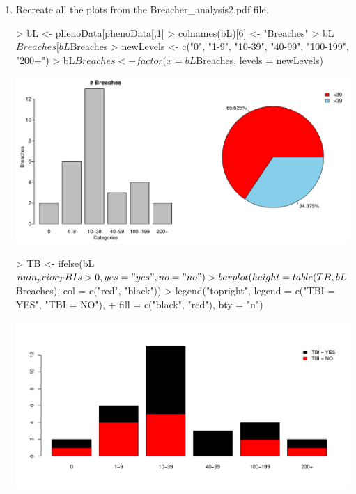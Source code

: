 \documentclass[12pt,a4paper]{paper}
\begin{document}
\begin{enumerate}
\begin{enumerate}
\item Recreate all the plots from the Breacher\_analysis2.pdf file.
\begin{Schunk}
\begin{Sinput}
> bL <- phenoData[phenoData[,1] %
> colnames(bL)[6] <- "Breaches"
> bL$Breaches[bL$Breaches %
> newLevels <- c("0", "1-9", "10-39", "40-99", "100-199", "200+")
> bL$Breaches <- factor(x = bL$Breaches, levels = newLevels)
\end{Sinput}
\end{Schunk}
\begin{Schunk}
\end{Schunk}
\includegraphics{Osorio_Daniel_HW3-005}
\begin{Schunk}
\begin{Sinput}
> TB <- ifelse(bL$num_prior_TBIs > 0, yes = "yes", no = "no")
> barplot(height = table(TB, bL$Breaches), col = c("red", "black"))
> legend("topright", legend = c("TBI = YES", "TBI = NO"), 
+        fill = c("black", "red"), bty = "n")
\end{Sinput}
\end{Schunk}
\includegraphics{Osorio_Daniel_HW3-006}


\end{enumerate}
\end{enumerate}
\end{document}
